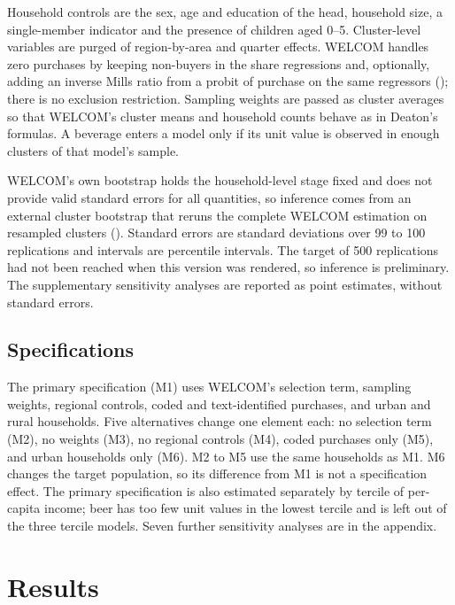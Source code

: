 \documentclass[
  11pt,
]{article}
\begin{document}
Household controls are the sex, age and education of the head, household
size, a single-member indicator and the presence of children aged 0--5.
Cluster-level variables are purged of region-by-area and quarter
effects. WELCOM handles zero purchases by keeping non-buyers in the
share regressions and, optionally, adding an inverse Mills ratio from a
probit of purchase on the same regressors
(); there is no
exclusion restriction. Sampling weights are passed as cluster averages
so that WELCOM's cluster means and household counts behave as in
Deaton's formulas. A beverage enters a model only if its unit value is
observed in enough clusters of that model's sample.

WELCOM's own bootstrap holds the household-level stage fixed and does
not provide valid standard errors for all quantities, so inference comes
from an external cluster bootstrap that reruns the complete WELCOM
estimation on resampled clusters
(). Standard errors are standard deviations over 99 to 100
replications and intervals are percentile intervals. The target of 500
replications had not been reached when this version was rendered, so
inference is preliminary. The supplementary sensitivity analyses are
reported as point estimates, without standard errors.

\subsection{Specifications}\label{specifications}

The primary specification (M1) uses WELCOM's selection term, sampling
weights, regional controls, coded and text-identified purchases, and
urban and rural households. Five alternatives change one element each:
no selection term (M2), no weights (M3), no regional controls (M4),
coded purchases only (M5), and urban households only (M6). M2 to M5 use
the same households as M1. M6 changes the target population, so its
difference from M1 is not a specification effect. The primary
specification is also estimated separately by tercile of per-capita
income; beer has too few unit values in the lowest tercile and is left
out of the three tercile models. Seven further sensitivity analyses are
in the appendix.

\section{Results}\label{results}
\end{document}
